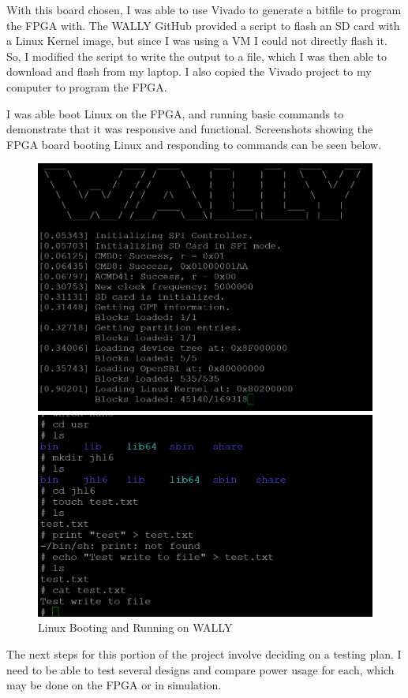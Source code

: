\documentclass[conference]{IEEEtran}
\begin{document}
With this board chosen, I was able to use Vivado to generate a bitfile to program the FPGA with. The WALLY GitHub provided a script to flash an SD card with a Linux Kernel image, but since I was using a VM I could not directly flash it. So, I modified the script to write the output to a file, which I was then able to download and flash from my laptop. I also copied the Vivado project to my computer to program the FPGA.

I was able boot Linux on the FPGA, and running basic commands to demonstrate that it was responsive and functional. Screenshots showing the FPGA board booting Linux and responding to commands can be seen below.

\begin{figure}[htbp]
\centerline{\includegraphics[width=0.9\linewidth]{Linux_Boot.png}}
\centerline{\includegraphics[width=0.9\linewidth]{WALLY_Linux.png}}
\caption{Linux Booting and Running on WALLY}
\label{fig}
\end{figure}

The next steps for this portion of the project involve deciding on a testing plan. I need to be able to test several designs and compare power usage for each, which may be done on the FPGA or in simulation.
\end{document}
